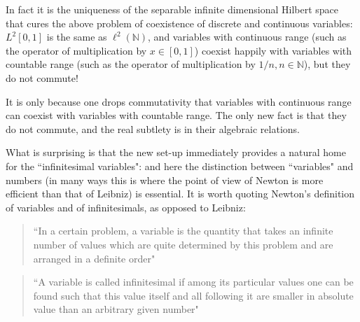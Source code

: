 \documentclass[12pt]{article}
\def\N{{\mathbb N}}
\begin{document}
\bigskip 

In fact it is the uniqueness of the separable infinite dimensional Hilbert space that cures the above problem of coexistence of discrete and continuous variables: $L^2[0,1]$ is the same as $\ell^2(\N)$, and variables with continuous range (such as the operator of multiplication by $x\in [0,1]$) coexist happily with variables with countable range (such as the operator of multiplication by $1/n, n\in \N$),  but they do not commute!

It is only because one drops commutativity that variables with continuous range can coexist with variables with countable range. 
 The only new fact is that they do not commute, and the real subtlety is in their algebraic relations. 


 What is surprising is that the new set-up immediately provides a natural home for the ``infinitesimal variables": and here the distinction between ``variables" and numbers (in many ways this is where the point of view of Newton is more efficient than that of Leibniz) is essential.
 It is worth quoting Newton's definition of variables and of infinitesimals, as opposed to Leibniz:
{\em

\begin{quote}``In a certain problem, a variable is the quantity that takes an infinite number of values which are quite determined by this problem and are arranged in a definite order"\end{quote}

\begin{quote} ``A variable is called infinitesimal if among its particular values one can be found such that this value itself and all following it are smaller in absolute value than an arbitrary given number"\end{quote}}
\end{document}

